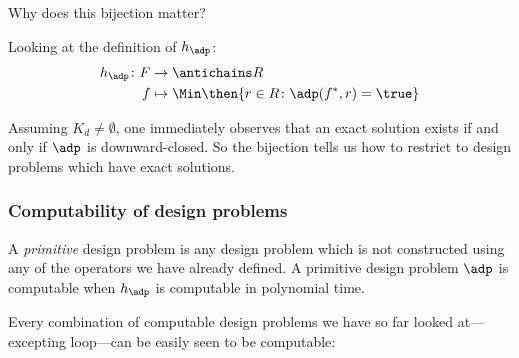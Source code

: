  

Why does this bijection matter?

Looking at the definition of $h_\adp$:
\begin{equation}
\begin{aligned}
h_\adp \colon F &\to \antichains R \\
f &\mapsto \Min \then \{ r \in R \colon \adp(f^*, r) = \true \}
\end{aligned}
\end{equation}

Assuming $K_d \neq \emptyset$, one immediately observes that an exact solution exists if and only if $\adp$ is downward-closed. So the bijection tells us how to restrict to design problems which have exact solutions.  %


\subsubsection{Computability of design problems}

A \emph{primitive} design problem is any design problem which is not constructed using any of the operators we have already defined. A primitive design problem $\adp$ is computable when $h_\adp$ is computable in polynomial time. %

 

 

 

Every combination of computable design problems we have so far looked at---excepting loop---can be easily seen to be computable:

